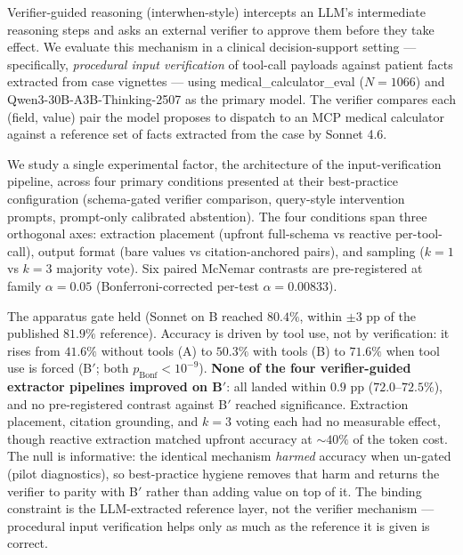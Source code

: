 
Verifier-guided reasoning (interwhen-style) intercepts an LLM's intermediate
reasoning steps and asks an external verifier to approve them before they
take effect. We evaluate this mechanism in a clinical decision-support
setting --- specifically, \emph{procedural input verification} of tool-call
payloads against patient facts extracted from case vignettes --- using
medical\_calculator\_eval ($N=1066$) and Qwen3-30B-A3B-Thinking-2507 as the
primary model. The verifier compares each (field, value) pair the model
proposes to dispatch to an MCP medical calculator against a reference set
of facts extracted from the case by Sonnet 4.6.

We study a single experimental factor, the architecture of the
input-verification pipeline, across four primary conditions presented at
their best-practice configuration (schema-gated verifier comparison,
query-style intervention prompts, prompt-only calibrated abstention).
The four conditions span three orthogonal axes: extraction placement
(upfront full-schema vs reactive per-tool-call), output format (bare
values vs citation-anchored pairs), and sampling ($k=1$ vs $k=3$ majority
vote). Six paired McNemar contrasts are pre-registered at family
$\alpha=0.05$ (Bonferroni-corrected per-test $\alpha=0.00833$).

The apparatus gate held (Sonnet on B reached $80.4\%$, within $\pm 3$
pp of the published $81.9\%$ reference). Accuracy is driven by tool use,
not by verification: it rises from $41.6\%$ without tools (A) to
$50.3\%$ with tools (B) to $71.6\%$ when tool use is forced (B$'$; both
$p_{\text{Bonf}} < 10^{-9}$). \textbf{None of the four
verifier-guided extractor pipelines improved on B$'$}: all landed
within $0.9$ pp ($72.0$--$72.5\%$), and no pre-registered contrast
against B$'$ reached significance. Extraction placement, citation
grounding, and $k=3$ voting each had no measurable effect, though
reactive extraction matched upfront accuracy at $\sim$$40\%$ of the
token cost. The null is informative: the identical mechanism
\emph{harmed} accuracy when un-gated (pilot diagnostics), so
best-practice hygiene removes that harm and returns the verifier to
parity with B$'$ rather than adding value on top of it. The binding
constraint is the LLM-extracted reference layer, not the verifier
mechanism --- procedural input verification helps only as much as the
reference it is given is correct.
